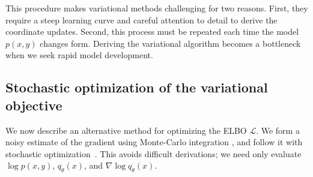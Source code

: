 

This procedure makes variational methods challenging for two reasons.
First, they require a steep learning curve and careful attention to
detail to derive the coordinate updates. Second, this process must be
repeated each time the model $p(x, y)$ changes form.  Deriving the
variational algorithm becomes a bottleneck when we seek rapid model
development.





\subsection{Stochastic optimization of the variational objective}

We now describe an alternative method for optimizing the ELBO
$\mathcal{L}$. We form a noisy estimate of the gradient using
Monte-Carlo integration \cite{graves:2011,wei:1990,carbonetto:2009},
and follow it with stochastic optimization~\cite{robbins:1951}.  This
avoids difficult derivations; we need only evaluate $\log p(x, y)$,
$q_\theta(x)$, and $\nabla \log q_\theta(x)$.

